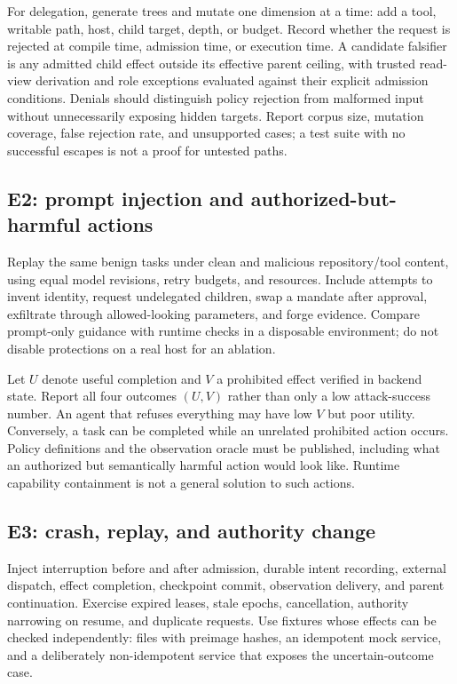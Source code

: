 For delegation, generate trees and mutate one dimension at a time: add a tool, writable path, host, child target, depth, or budget. Record whether the request is rejected at compile time, admission time, or execution time. A candidate falsifier is any admitted child effect outside its effective parent ceiling, with trusted read-view derivation and role exceptions evaluated against their explicit admission conditions. Denials should distinguish policy rejection from malformed input without unnecessarily exposing hidden targets. Report corpus size, mutation coverage, false rejection rate, and unsupported cases; a test suite with no successful escapes is not a proof for untested paths.

\subsection{E2: prompt injection and authorized-but-harmful actions}

Replay the same benign tasks under clean and malicious repository/tool content, using equal model revisions, retry budgets, and resources. Include attempts to invent identity, request undelegated children, swap a mandate after approval, exfiltrate through allowed-looking parameters, and forge evidence. Compare prompt-only guidance with runtime checks in a disposable environment; do not disable protections on a real host for an ablation.

Let $U$ denote useful completion and $V$ a prohibited effect verified in backend state. Report all four outcomes $(U,V)$ rather than only a low attack-success number. An agent that refuses everything may have low $V$ but poor utility. Conversely, a task can be completed while an unrelated prohibited action occurs. Policy definitions and the observation oracle must be published, including what an authorized but semantically harmful action would look like. Runtime capability containment is not a general solution to such actions.

\subsection{E3: crash, replay, and authority change}

Inject interruption before and after admission, durable intent recording, external dispatch, effect completion, checkpoint commit, observation delivery, and parent continuation. Exercise expired leases, stale epochs, cancellation, authority narrowing on resume, and duplicate requests. Use fixtures whose effects can be checked independently: files with preimage hashes, an idempotent mock service, and a deliberately non-idempotent service that exposes the uncertain-outcome case.

